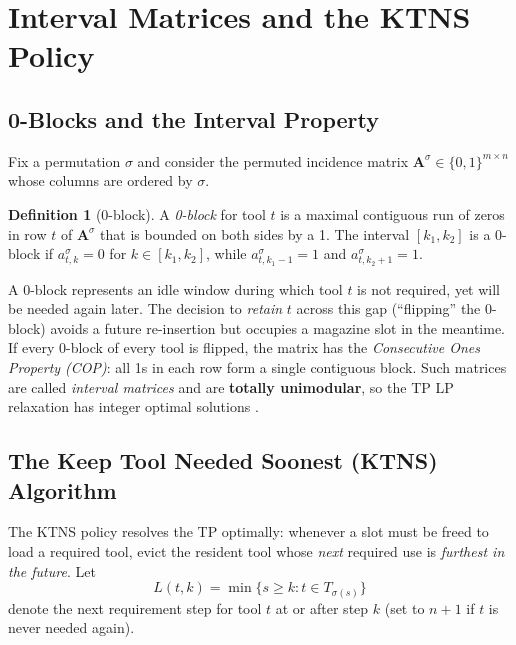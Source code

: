 \documentclass[11pt,a4paper]{article}
\theoremstyle{plain}
\theoremstyle{definition}
\newtheorem{definition}[theorem]{Definition}
\begin{document}
\section{Interval Matrices and the KTNS Policy}
\label{sec:ktns}

\subsection{0-Blocks and the Interval Property}

Fix a permutation $\sigma$ and consider the permuted incidence matrix
$\mathbf{A}^\sigma \in \{0,1\}^{m \times n}$ whose columns are ordered by $\sigma$.

\begin{definition}[0-block]
A \emph{0-block} for tool $t$ is a maximal contiguous run of zeros in row $t$ of
$\mathbf{A}^\sigma$ that is bounded on both sides by a 1. The interval $[k_1,k_2]$
is a 0-block if $a^\sigma_{t,k}=0$ for $k\in[k_1,k_2]$, while $a^\sigma_{t,k_1-1}=1$
and $a^\sigma_{t,k_2+1}=1$.
\end{definition}

A 0-block represents an idle window during which tool $t$ is not required, yet will
be needed again later. The decision to \emph{retain} $t$ across this gap (``flipping''
the 0-block) avoids a future re-insertion but occupies a magazine slot in the meantime.
If every 0-block of every tool is flipped, the matrix has the \emph{Consecutive Ones
Property (COP)}: all 1s in each row form a single contiguous block. Such matrices are
called \emph{interval matrices} and are \textbf{totally unimodular}, so the TP LP
relaxation has integer optimal solutions \cite{Crama1994}.

\subsection{The Keep Tool Needed Soonest (KTNS) Algorithm}

The KTNS policy resolves the TP optimally: whenever a slot must be freed to load a
required tool, evict the resident tool whose \emph{next} required use is
\emph{furthest in the future}. Let
\[
  L(t,k) = \min\{s \ge k : t \in T_{\sigma(s)}\}
\]
denote the next requirement step for tool $t$ at or after step $k$
(set to $n+1$ if $t$ is never needed again).
\end{document}

